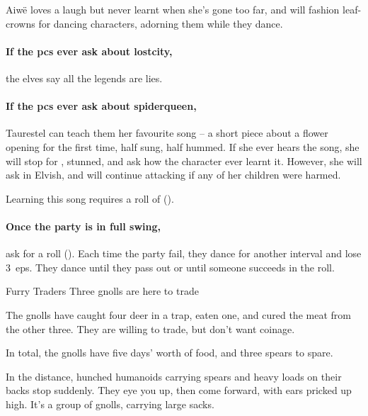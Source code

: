 Aiw\"{e} loves a laugh but never learnt when she's gone too far, and will fashion leaf-crowns for dancing characters, adorning them while they dance.


\showStdSpells


\paragraph{If the \glspl{pc} ever ask about \gls{lostcity},}
the elves say all the legends are lies.

\paragraph{If the \glspl{pc} ever ask about \gls{spiderqueen},}
Taurestel can teach them her favourite song -- a short piece about a flower opening for the first time, half sung, half hummed.
If she ever hears the song, she will stop for , stunned, and ask how the character ever learnt it.
However, she will ask in Elvish, and will continue attacking if any of her children were harmed.

Learning this song requires a roll of  (\tn[10]).

\paragraph{Once the party is in full swing,}
ask for a  roll (\tn[12]).
Each time the party fail, they dance for another \gls{interval} and lose 3~\glspl{ep}.
They dance until they pass out or until someone succeeds in the roll.

{Furry Traders}%
{Three gnolls are here to trade}%

The gnolls have caught four deer in a trap, eaten one, and cured the meat from the other three.
They are willing to trade, but don't want coinage.

In total, the gnolls have five days' worth of food, and three spears to spare.

\begin{boxtext}
  In the distance, hunched humanoids carrying spears and heavy loads on their backs stop suddenly.
  They eye you up, then come forward, with ears pricked up high.
  It's a group of gnolls, carrying large sacks.
\end{boxtext}


